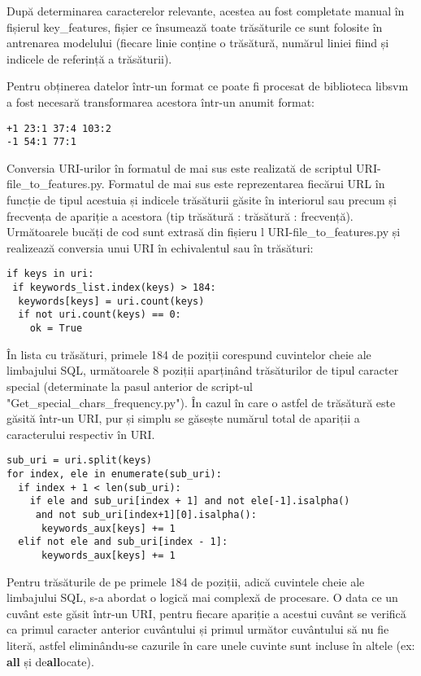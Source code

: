 După determinarea caracterelor relevante, acestea au fost completate manual în fișierul key\_features, fișier ce însumează toate trăsăturile ce sunt folosite în antrenarea modelului (fiecare linie conține o trăsătură, numărul liniei fiind și indicele de referință a trăsăturii). 

Pentru obținerea datelor într-un format ce poate fi procesat de biblioteca libsvm \cite{libsvm} a fost necesară transformarea acestora într-un anumit format: 

\begin{lstlisting}
+1 23:1 37:4 103:2
-1 54:1 77:1
\end{lstlisting}

Conversia URI-urilor în formatul de mai sus este realizată de scriptul  URI-file\_to\_features.py.  Formatul de mai sus este reprezentarea fiecărui URL în funcție de tipul acestuia și indicele trăsăturii găsite în interiorul sau precum și frecvența de apariție a acestora (tip trăsătură : trăsătură : frecvență). Următoarele bucăți de cod sunt extrasă din fișieru l URI-file\_to\_features.py  și realizează conversia unui URI în echivalentul sau în trăsături: 

\begin{lstlisting}
if keys in uri:
 if keywords_list.index(keys) > 184:
  keywords[keys] = uri.count(keys)
  if not uri.count(keys) == 0:
    ok = True
\end{lstlisting}

În lista cu trăsături, primele 184 de poziții corespund cuvintelor cheie ale limbajului SQL, următoarele 8 poziții aparținând trăsăturilor de tipul caracter special (determinate la pasul anterior de script-ul "Get\_special\_chars\_frequency.py"). În cazul în care o astfel de trăsătură este găsită într-un URI, pur și simplu se găsește numărul total de apariții a caracterului respectiv în URI. 


\begin{lstlisting}
sub_uri = uri.split(keys)
for index, ele in enumerate(sub_uri):
  if index + 1 < len(sub_uri):
    if ele and sub_uri[index + 1] and not ele[-1].isalpha()
     and not sub_uri[index+1][0].isalpha():
      keywords_aux[keys] += 1
  elif not ele and sub_uri[index - 1]:
      keywords_aux[keys] += 1
\end{lstlisting}

Pentru trăsăturile de pe primele 184 de poziții, adică cuvintele cheie ale limbajului SQL, s-a abordat o logică mai complexă de procesare. O data ce un cuvânt este găsit într-un URI, pentru fiecare apariție a acestui cuvânt se verifică ca primul caracter anterior cuvântului și primul următor cuvântului să nu fie literă, astfel eliminându-se cazurile în care unele cuvinte sunt incluse în altele (ex:  \textbf{all} și de\textbf{all}ocate).

